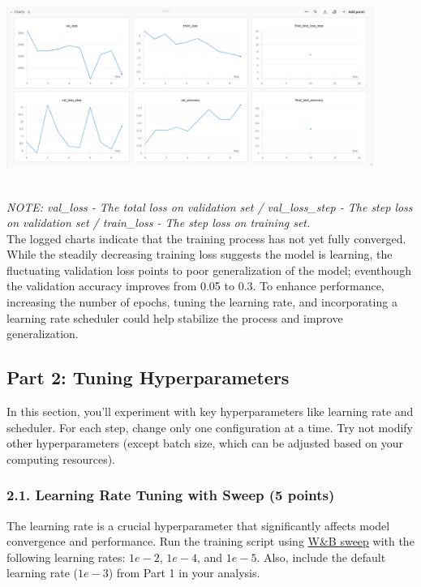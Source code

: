 \documentclass[11pt, oneside]{article}   	%
\begin{document}
\begin{center}
    \includegraphics[width=0.9\textwidth]{report_pic/Logged_Charts.png}
\end{center}
\\
\textit{NOTE: val\_loss - The total loss on validation set / val\_loss\_step - The step loss on validation set / train\_loss - The step loss on training set.}
\\
The logged charts indicate that the training process has not yet fully converged.
While the steadily decreasing training loss suggests the model is learning, the fluctuating validation loss points to poor generalization of the model;
eventhough the validation accuracy improves from 0.05 to 0.3. To enhance performance, increasing the number of epochs, tuning the learning rate, and incorporating a learning rate scheduler could help stabilize the process and improve generalization.

\subsection*{Part 2: Tuning Hyperparameters}
In this section, you'll experiment with key hyperparameters like learning rate and scheduler. For each step, change only one configuration at a time. Try not modify other hyperparameters (except batch size, which can be adjusted based on your computing resources).

\subsubsection*{2.1. Learning Rate Tuning with Sweep (5 points)}
 The learning rate is a crucial hyperparameter that significantly affects model convergence and performance.  Run the training script using \href{https://docs.wandb.ai/guides/sweeps/walkthrough}{W\&B sweep} with the following learning rates: $1e-2$, $1e-4$, and $1e-5$. Also, include the default learning rate ($1e-3$) from Part 1 in your analysis.
\end{document}
